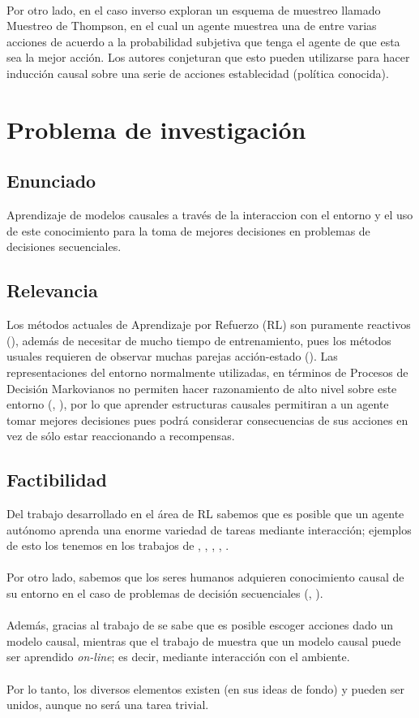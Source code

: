 \documentclass[11pt]{article}
\theoremstyle{plain}
\begin{document}
\\
Por otro lado, en el caso inverso \cite{ortega2014generalized} exploran un esquema de muestreo llamado Muestreo de Thompson, en el cual un agente muestrea una de entre varias acciones de acuerdo a la probabilidad subjetiva que tenga el agente de que esta sea la mejor acción. Los autores conjeturan que esto pueden utilizarse para hacer inducción causal sobre una serie de acciones establecidad (política conocida).

\section{Problema de investigación}
\subsection{Enunciado}
Aprendizaje de modelos causales a través de la interaccion con el entorno y el uso de este conocimiento para la toma de mejores decisiones en problemas de decisiones secuenciales.
\subsection{Relevancia}
Los métodos actuales de Aprendizaje por Refuerzo (RL) son puramente reactivos (\cite{garnelo2016towards}), además de necesitar de mucho tiempo de entrenamiento, pues los métodos usuales requieren de observar muchas parejas acción-estado (\cite{sutton1998reinforcement}). Las representaciones del entorno normalmente utilizadas, en términos de Procesos de Decisión Markovianos no permiten hacer razonamiento de alto nivel sobre este entorno (\cite{innes2018reasoning}, \cite{garnelo2016towards}), por lo que aprender estructuras causales permitiran a un agente tomar mejores decisiones pues podrá considerar consecuencias de sus acciones en vez de sólo estar reaccionando a recompensas.
\subsection{Factibilidad}
Del trabajo desarrollado en el área de RL sabemos que es posible que un agente autónomo aprenda una enorme variedad de tareas mediante interacción; ejemplos de esto los tenemos en los trabajos de \cite{mnih2013playing}, \cite{mnih2015human}, \cite{silver2016mastering}, \cite{silver2017mastering}, \cite{impala2018}. \\
\\
Por otro lado, sabemos que los seres humanos adquieren conocimiento causal de su entorno en el caso de problemas de decisión secuenciales (\cite{hagmayer2009decision}, \cite{hagmayer2013repeated}).\\
\\
Además, gracias al trabajo de \cite{lattimoreNIPS2016} se sabe que es posible escoger acciones dado un modelo causal, mientras que el trabajo de \cite{wellen2012learning} muestra que un modelo causal puede ser aprendido \textit{on-line}; es decir, mediante interacción con el ambiente.\\
\\
Por lo tanto, los diversos elementos existen (en sus ideas de fondo) y pueden ser unidos, aunque no será una tarea trivial. 
\end{document}
